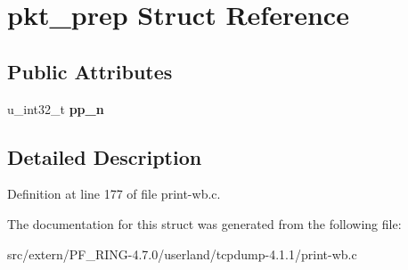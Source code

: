 \hypertarget{structpkt__prep}{
\section{pkt\_\-prep Struct Reference}
\label{structpkt__prep}
}
\subsection*{Public Attributes}
\begin{DoxyCompactItemize}
\item 
\hypertarget{structpkt__prep_a09b2e2220bd3b59de8d12095155e8778}{
u\_\-int32\_\-t {\bfseries pp\_\-n}}
\label{structpkt__prep_a09b2e2220bd3b59de8d12095155e8778}

\end{DoxyCompactItemize}


\subsection{Detailed Description}


Definition at line 177 of file print-\/wb.c.



The documentation for this struct was generated from the following file:\begin{DoxyCompactItemize}
\item 
src/extern/PF\_\-RING-\/4.7.0/userland/tcpdump-\/4.1.1/print-\/wb.c\end{DoxyCompactItemize}
